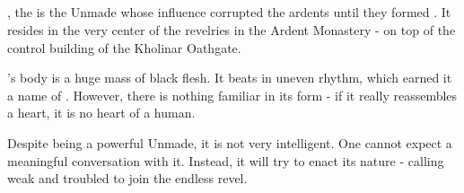 






\subsection{\enemyHeartOfTheRevelName{}}

\npcHeartRevel{}, the \npcHeartRevelTitle{} is the Unmade whose influence corrupted the ardents until they formed \npcFractionCult{}. It resides in the very center of the revelries in the Ardent Monastery - on top of the control building of the Kholinar Oathgate.

\npcHeartRevel{}'s body is a huge mass of black flesh. It beats in uneven rhythm, which earned it a name of \npcHeartRevelTitle{}. However, there is nothing familiar in its form - if it really reassembles a heart, it is no heart of a human.

Despite being a powerful Unmade, it is not very intelligent. One cannot expect a meaningful conversation with it. Instead, it will try to enact its nature - calling weak and troubled to join the endless revel.


